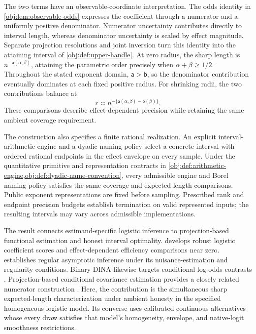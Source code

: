 The two terms have an observable-coordinate interpretation. The odds identity in \cref{obj:lem:observable-odds} expresses the coefficient through a numerator and a uniformly positive denominator. Numerator uncertainty contributes directly to interval length, whereas denominator uncertainty is scaled by effect magnitude. Separate projection resolutions and joint inversion turn this identity into the attaining interval of \cref{obj:def:upper-handle}. At zero radius, the sharp length is \(n^{-\mathsf a(\alpha,\beta)}\), attaining the parametric order precisely when \(\alpha+\beta\ge1/2\). Throughout the stated exponent domain, \(\mathsf a>\mathsf b\), so the denominator contribution eventually dominates at each fixed positive radius. For shrinking radii, the two contributions balance at
\[
r\asymp n^{-\{\mathsf a(\alpha,\beta)-\mathsf b(\beta)\}}.
\]
These comparisons describe effect-dependent precision while retaining the same ambient coverage requirement.

The construction also specifies a finite rational realization. An explicit interval-arithmetic engine and a dyadic naming policy select a concrete interval with ordered rational endpoints in the effect envelope on every sample. Under the quantitative primitive and representation contracts in \cref{obj:def:arithmetic-engine,obj:def:dyadic-name-convention}, every admissible engine and Borel naming policy satisfies the same coverage and expected-length comparisons. Public exponent representations are fixed before sampling. Prescribed rank and endpoint precision budgets establish termination on valid represented inputs; the resulting intervals may vary across admissible implementations.

The result connects estimand-specific logistic inference to projection-based functional estimation and honest interval optimality. \citet[Propositions 1--3]{Tan2019LogisticDR} develops robust logistic coefficient scores and effect-dependent efficiency comparisons near zero. \citet[arXiv version 1, Assumptions REG and ML1, Theorem 2]{LiuZhangZhou2020LogisticDML} establishes regular asymptotic inference under its nuisance-estimation and regularity conditions. Binary DINA likewise targets conditional log-odds contrasts \citep[Section 2.1.1, equation (5)]{GaoHastie2025DINA}. Projection-based conditional covariance estimation provides a closely related numerator construction \citep[version 5, Theorem 1 and Corollary 1]{McGrath2026}. Here, the contribution is the simultaneous sharp expected-length characterization under ambient honesty in the specified homogeneous logistic model. Its converse uses calibrated continuous alternatives whose every draw satisfies that model's homogeneity, envelope, and native-logit smoothness restrictions.

